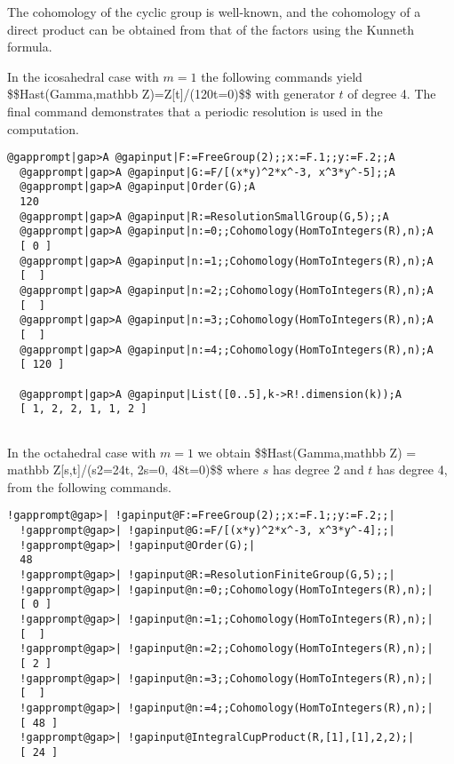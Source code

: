 \documentclass[a4paper,11pt]{report}
\begin{document}
{{The cohomology of the cyclic group is well-known, and the cohomology of a
direct product can be obtained from that of the factors using the Kunneth
formula. 

 In the icosahedral case with $m=1$ the following commands yield
\$\$H\texttt{}\texttt{}ast(\texttt{}Gamma,\texttt{}mathbb
Z)=Z[t]/(120t=0)\$\$ with generator $t$ of degree 4. The final command demonstrates that a periodic resolution is used
in the computation. 
\begin{Verbatim}[commandchars=@|A,fontsize=\small,frame=single,label=Example]
  @gapprompt|gap>A @gapinput|F:=FreeGroup(2);;x:=F.1;;y:=F.2;;A
  @gapprompt|gap>A @gapinput|G:=F/[(x*y)^2*x^-3, x^3*y^-5];;A
  @gapprompt|gap>A @gapinput|Order(G);A
  120
  @gapprompt|gap>A @gapinput|R:=ResolutionSmallGroup(G,5);;A
  @gapprompt|gap>A @gapinput|n:=0;;Cohomology(HomToIntegers(R),n);A
  [ 0 ]
  @gapprompt|gap>A @gapinput|n:=1;;Cohomology(HomToIntegers(R),n);A
  [  ]
  @gapprompt|gap>A @gapinput|n:=2;;Cohomology(HomToIntegers(R),n);A
  [  ]
  @gapprompt|gap>A @gapinput|n:=3;;Cohomology(HomToIntegers(R),n);A
  [  ]
  @gapprompt|gap>A @gapinput|n:=4;;Cohomology(HomToIntegers(R),n);A
  [ 120 ]
  
  @gapprompt|gap>A @gapinput|List([0..5],k->R!.dimension(k));A
  [ 1, 2, 2, 1, 1, 2 ]
  
\end{Verbatim}
 In the octahedral case with $m=1$ we obtain
\$\$H\texttt{}\texttt{}ast(\texttt{}Gamma,\texttt{}mathbb
Z) = \texttt{}mathbb Z[s,t]/(s\texttt{}2=24t, 2s=0,
48t=0)\$\$ where $s$ has degree 2 and $t$ has degree 4, from the following commands. 
\begin{Verbatim}[commandchars=!@|,fontsize=\small,frame=single,label=Example]
  !gapprompt@gap>| !gapinput@F:=FreeGroup(2);;x:=F.1;;y:=F.2;;|
  !gapprompt@gap>| !gapinput@G:=F/[(x*y)^2*x^-3, x^3*y^-4];;|
  !gapprompt@gap>| !gapinput@Order(G);|
  48
  !gapprompt@gap>| !gapinput@R:=ResolutionFiniteGroup(G,5);;|
  !gapprompt@gap>| !gapinput@n:=0;;Cohomology(HomToIntegers(R),n);|
  [ 0 ]
  !gapprompt@gap>| !gapinput@n:=1;;Cohomology(HomToIntegers(R),n);|
  [  ]
  !gapprompt@gap>| !gapinput@n:=2;;Cohomology(HomToIntegers(R),n);|
  [ 2 ]
  !gapprompt@gap>| !gapinput@n:=3;;Cohomology(HomToIntegers(R),n);|
  [  ]
  !gapprompt@gap>| !gapinput@n:=4;;Cohomology(HomToIntegers(R),n);|
  [ 48 ]
  !gapprompt@gap>| !gapinput@IntegralCupProduct(R,[1],[1],2,2);|
  [ 24 ]
  

\end{Verbatim}}}
\end{document}
